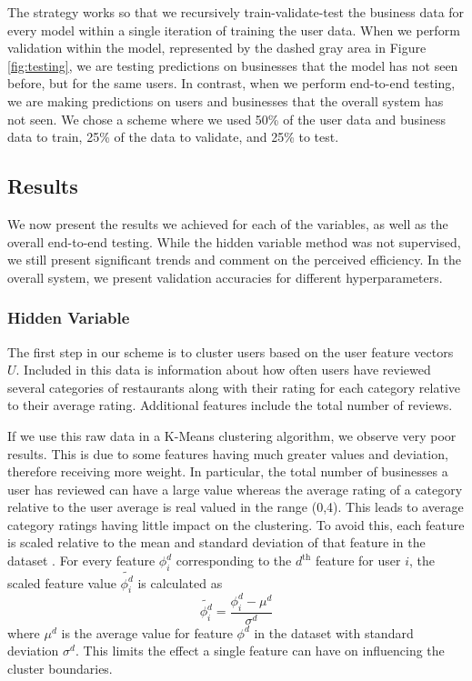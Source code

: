 \documentclass[11pt]{article}
\begin{document}
The strategy works so that we recursively train-validate-test the business data for every model within a single iteration of training the user data. When we perform validation within the model, represented by the dashed gray area in Figure \ref{fig:testing}, we are testing predictions on businesses that the model has not seen before, but for the same users. In contrast, when we perform end-to-end testing, we are making predictions on users and businesses that the overall system has not seen. We chose a scheme where we used 50\% of the user data and business data to train, 25\% of the data to validate, and 25\% to test.

\subsection{Results}
We now present the results we achieved for each of the variables, as well as the overall end-to-end testing. While the hidden variable method was not supervised, we still present significant trends and comment on the perceived efficiency. In the overall system, we present validation accuracies for different hyperparameters.

\subsubsection{Hidden Variable}
The first step in our scheme is to cluster users based on the user feature vectors $U$. Included in this data is information about how often users have reviewed several categories of restaurants along with their rating for each category relative to their average rating. Additional features include the total number of reviews. 
 
If we use this raw data in a K-Means clustering algorithm, we observe very poor results. This is due to some features having much greater values and deviation, therefore receiving more weight. In particular, the total number of businesses a user has reviewed can have a large value whereas the average rating of a category relative to the user average is real valued in the range (0,4). This leads to average category ratings having little impact on the clustering. To avoid this, each feature is scaled relative to the mean and standard deviation of that feature in the dataset \cite{kmeans}. For every feature $\phi^d_i$ corresponding to the $d^{\text{th}}$ feature for user $i$, the scaled feature value $\tilde{\phi^d_i}$ is calculated as
 \begin{equation}
\tilde{\phi^d_i} = \frac{\phi^d_i - \mu^d}{\sigma^d}
 \end{equation}
 where $\mu^d$ is the average value for feature $\phi^d$ in the dataset with standard deviation $\sigma^d$. This limits the effect a single feature can have on influencing the cluster boundaries.
 
\end{document}
